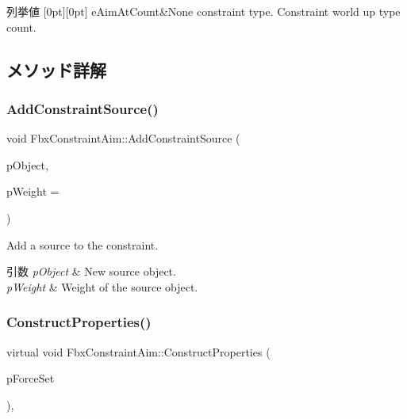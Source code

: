 \begin{DoxyEnumFields}{列挙値}
[0pt][0pt]{}\mbox{\label{class_fbx_constraint_aim_a90316b1564490f5dd0b24e552fe6e637ad2513eb36142b46f590c27043d713c31}} 
e\+Aim\+At\+Count&None constraint type. Constraint world up type count. \\
\hline

\end{DoxyEnumFields}


\subsection{メソッド詳解}
\mbox{\label{class_fbx_constraint_aim_aca502b2b0a4587133e843c5b917acee6}} 
\subsubsection{\texorpdfstring{Add\+Constraint\+Source()}{AddConstraintSource()}}
{\footnotesize\ttfamily void Fbx\+Constraint\+Aim\+::\+Add\+Constraint\+Source (\begin{DoxyParamCaption}\item[{\hyperlink{class_fbx_object}{Fbx\+Object} $\ast$}]{p\+Object,  }\item[{double}]{p\+Weight = {} }\end{DoxyParamCaption})}

Add a source to the constraint. 
\begin{DoxyParams}{引数}
{\em p\+Object} & New source object. \\
\hline
{\em p\+Weight} & Weight of the source object. \\
\hline
\end{DoxyParams}
\mbox{\label{class_fbx_constraint_aim_a295c1f47dce7a051886dc6b9bb68025f}} 
\subsubsection{\texorpdfstring{Construct\+Properties()}{ConstructProperties()}}
{\footnotesize\ttfamily virtual void Fbx\+Constraint\+Aim\+::\+Construct\+Properties (\begin{DoxyParamCaption}\item[{bool}]{p\+Force\+Set }\end{DoxyParamCaption})\hspace{0.3cm}{\ttfamily [protected]}, {\ttfamily [virtual]}}

